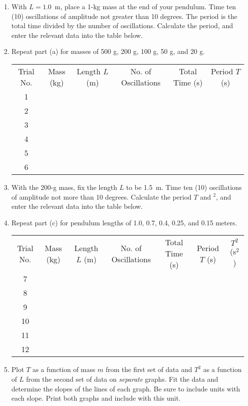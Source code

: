 \begin{enumerate}[labparts]

\item With $L = 1.0$~m, place a 1-kg mass at the end of your pendulum. Time ten (10) oscillations of amplitude not greater than 10 degrees. The period is the total time divided by the number of oscillations. Calculate the period, and enter the relevant data into the table below.

\item Repeat part (a) for masses of 500 g, 200 g, 100 g, 50 g, and 20 g.

\begin{center}
{\renewcommand{\arraystretch}{1.1}
\begin{tabular}{|c|c|c|c|c|c|} \hline 
Trial No. & Mass (kg) & Length $L$ (m) & No. of Oscillations& Total Time (s) & Period $T$ (s) \\ 
\hhline{|=|=|=|=|=|=|}
1 & & & & & \\ \hline 
2 & & & & & \\ \hline 
3 & & & & & \\ \hline 
4 & & & & & \\ \hline 
5 & & & & & \\ \hline
 6 & & & & & \\ \hline 
\end{tabular} }
\end{center}

\item With the 200-g mass, fix the length $L$ to be 1.5~m. Time ten (10) oscillations of amplitude not more than 10 degrees. Calculate the period $T$ and $^2$, and enter the relevant data into the table below.

\item Repeat part (c) for pendulum lengths of 1.0, 0.7, 0.4, 0.25, and 0.15 meters.

\begin{center}
{\renewcommand{\arraystretch}{1.1}
\begin{tabular}{|c|c|c|c|c|c|c|} \hline
Trial No. & Mass (kg) & Length $L$ (m) & No. of Oscillations& Total Time (s) & Period $T$ (s) & $T^2$ (s$^2$)\\ 
\hhline{|=|=|=|=|=|=|=|}
7 & & & & & & \\ \hline 
8 & & & & & & \\ \hline 
9 & & & & & & \\ \hline 
10 & & & & & & \\ \hline 
11 & & & & & & \\ \hline
12 &  & & & & & \\ \hline 
\end{tabular} }
\end{center}

\item Plot $T$ as a function of mass $m$ from the first set of data and $T^2$ as a function of $L$ from the second set of data on \textit{separate} graphs. Fit the data and determine the slopes of the lines of each graph. Be sure to include units with each slope. Print both graphs and include with this unit.

\end{enumerate}


